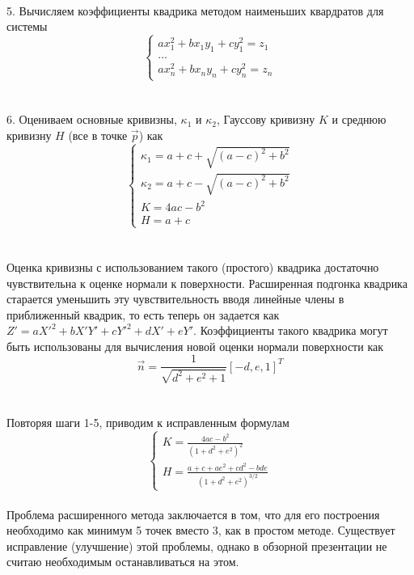 \documentclass[12pt,a4paper, titlepage]{article}
\begin{document}
\\
5. Вычисляем коэффициенты квадрика методом наименьших квардратов для системы
\begin{equation}
\begin{cases}
a x_1^2 + b x_1 y_1 + c y_1^2 = z_1
\\
...
\\
a x_n^2 + b x_n y_n + c y_n^2 = z_n
\end{cases}
\end{equation}
\\
\\
6. Оцениваем основные кривизны, $\kappa_1$ и $\kappa_2$, Гауссову кривизну $K$ и среднюю кривизну $H$ (все в точке $\vec{p}$) как
\begin{equation}
\begin{cases}
\kappa_1 = a + c + \sqrt{(a-c)^2 + b^2}
\\
\kappa_2 = a + c - \sqrt{(a-c)^2 + b^2}
\\
K = 4 a c - b^2
\\
H = a + c
\end{cases}
\end{equation}
\\
\\
Оценка кривизны с использованием такого (простого) квадрика достаточно чувствительна к оценке нормали к поверхности. Расширенная подгонка квадрика старается уменьшить эту чувствительность вводя линейные члены в приближенный квадрик, то есть теперь он задается как $Z' = a X'^2 + b X' Y' + c Y'^2 + d X' + e Y'$. Коэффициенты такого квадрика могут быть использованы для вычисления новой оценки нормали поверхности как
\begin{equation}
\vec{n} = \frac{1}{\sqrt{d^2+e^2 + 1}} [-d, e, 1]^T
\end{equation}
\\
\\
Повторяя шаги 1-5, приводим к исправленным формулам
\begin{equation}
\begin{cases}
K = \frac{4 a c - b^2}{(1+d^2+e^2)^2}
\\
H = \frac{a + c + ae^2 + cd^2 - b d e}{(1+d^2+e^2)^{3/2}}
\end{cases}
\end{equation}
\\
Проблема расширенного метода заключается в том, что для его построения необходимо как минимум 5 точек вместо 3, как в простом методе. Существует исправление (улучшение) этой проблемы, однако в обзорной презентации не считаю необходимым останавливаться на этом.
\end{document}
